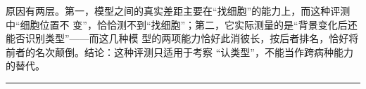 \documentclass[11pt]{article}
\begin{document}
原因有两层。第一，模型之间的真实差距主要在“找细胞”的能力上，而这种评测中“细胞位置不
变”，恰恰测不到“找细胞”；第二，它实际测量的是“背景变化后还能否识别类型”——而这几种模
型的两项能力恰好此消彼长，按后者排名，恰好将前者的名次颠倒。结论：这种评测只适用于考察
“认类型”，不能当作跨病种能力的替代。

\vspace{1.5em}
\noindent\rule{\linewidth}{0.4pt}

\vspace{0.5em}
\end{document}
